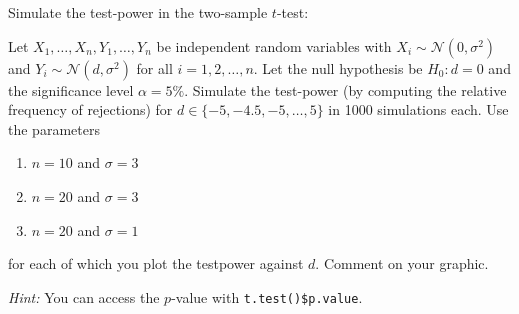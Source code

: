 
\begin{exercise}

Simulate the test-power in the two-sample $t$-test: 

Let $X_1,\dots,X_n,Y_1,\dots,Y_n$ be independent random variables 
with $X_i \sim \mathcal{N}(0,\sigma^2)$ and
$Y_i \sim \mathcal{N}(d,\sigma^2)$ for all $i = 1,2,\dots,n$.
Let the null hypothesis be $H_0: d = 0$ and the significance level $\alpha = 5\%$.
Simulate the test-power (by computing the relative frequency of rejections)
for $d \in \{-5,-4.5,-5,\dots,5\}$ in 1000 simulations each.
Use the parameters

\begin{enumerate}[label = (\alph*)]
  \item $n = 10$ and $\sigma = 3$
  \item $n = 20$ and $\sigma = 3$
  \item $n = 20$ and $\sigma = 1$
\end{enumerate}

for each of which you plot the testpower against $d$. Comment on your graphic.

\textit{Hint:} You can access the $p$-value with \texttt{t.test()\$p.value}.
\end{exercise}


\begin{solution}

\phantom{}

\end{solution}

